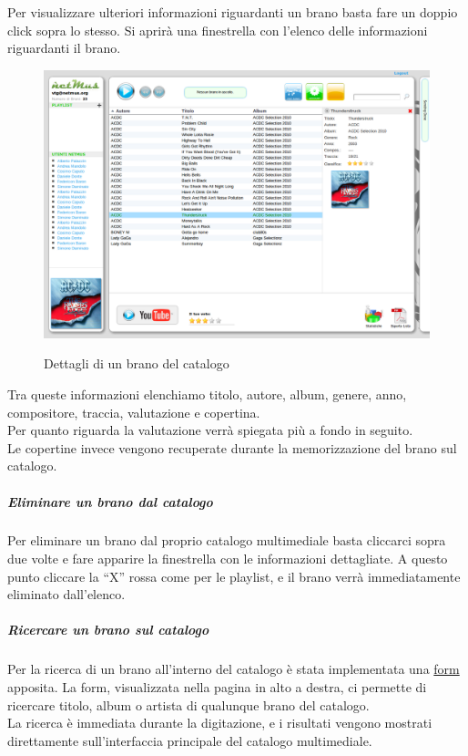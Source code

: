 Per visualizzare ulteriori informazioni riguardanti un brano basta fare un
doppio click sopra lo stesso. Si aprir\`a una finestrella con l'elenco delle
informazioni riguardanti il brano.\\
\begin{figure}[htbp]
  \centering
  \includegraphics[width=15cm]{img/MU/info_song.png}\\
\caption{Dettagli di un brano del catalogo}
\end{figure}

Tra queste informazioni elenchiamo titolo, autore, album, genere, anno,
compositore, traccia, valutazione e copertina.\\
Per quanto riguarda la valutazione verr\`a spiegata pi\`u a fondo in seguito.\\
Le copertine invece vengono recuperate durante la memorizzazione del brano sul
catalogo.

\subparagraph{Eliminare un brano dal catalogo}

Per eliminare un brano dal proprio catalogo multimediale basta cliccarci sopra
due volte e fare apparire la finestrella con le informazioni dettagliate. A
questo punto cliccare la ``X'' rossa come per le playlist, e il brano verr\`a
immediatamente eliminato dall'elenco.

\subparagraph{Ricercare un brano sul catalogo}

Per la ricerca di un brano all'interno del catalogo \`e stata implementata una
\underline{form} apposita. La form, visualizzata nella pagina in alto a destra,
ci permette di ricercare titolo, album o artista di qualunque brano del catalogo.\\
La ricerca \`e immediata durante la digitazione, e i risultati vengono mostrati
direttamente sull'interfaccia principale del catalogo multimediale.

